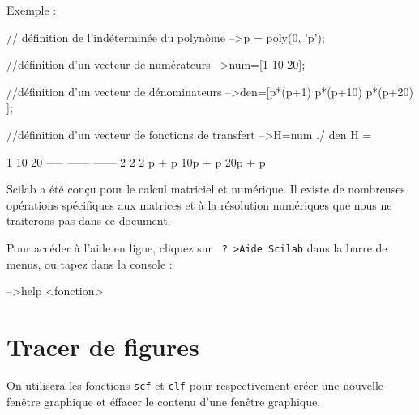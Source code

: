 Exemple :
\begin{Scilabcode}
// définition de l'indéterminée du polynôme
-->p = poly(0, 'p');

//définition d'un vecteur de numérateurs
-->num=[1 10 20];

//définition d'un vecteur de dénominateurs
-->den=[p*(p+1) p*(p+10) p*(p+20) ];

//définition d'un vecteur de fonctions de transfert
-->H=num ./ den
 H  =
 
      1         10          20      
    -----     ------      ------    
         2           2           2  
    p + p     10p + p     20p + p   
\end{Scilabcode}
Scilab a été conçu pour le calcul matriciel et numérique. 
Il existe de nombreuses opérations spécifiques aux matrices et à la 
résolution numériques que nous ne traiterons pas dans ce document.

Pour accéder à l'aide en ligne, cliquez sur \verb/ ? >Aide Scilab/ 
dans la barre de menus, ou tapez   dans la console :
\begin{Scilabcode}
-->help <fonction>
\end{Scilabcode}
\section{Tracer de figures}
On utilisera les fonctions \verb?scf? et \verb?clf?  pour respectivement
créer une nouvelle fenêtre graphique et éffacer le contenu d'une fenêtre 
graphique.
